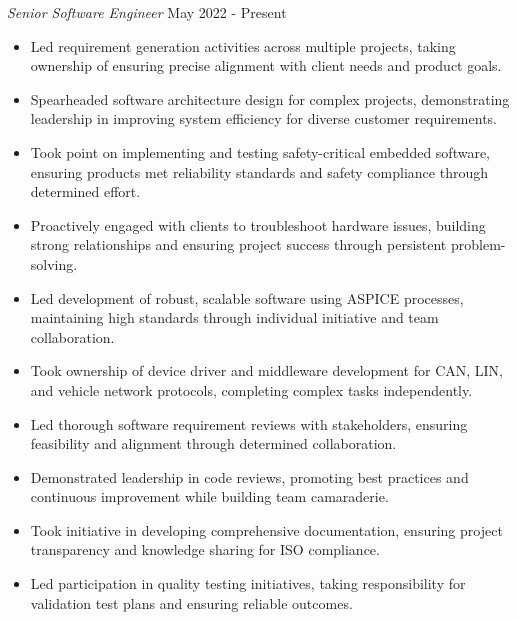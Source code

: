 \noindent
\textit{Senior Software Engineer} \hfill May 2022 - Present \\
\begin{itemize}[leftmargin=*,noitemsep,topsep=3pt]
    \item Led requirement generation activities across multiple projects, taking ownership of ensuring precise alignment with client needs and product goals.
    \item Spearheaded software architecture design for complex projects, demonstrating leadership in improving system efficiency for diverse customer requirements.
    \item Took point on implementing and testing safety-critical embedded software, ensuring products met reliability standards and safety compliance through determined effort.
    \item Proactively engaged with clients to troubleshoot hardware issues, building strong relationships and ensuring project success through persistent problem-solving.
    \item Led development of robust, scalable software using ASPICE processes, maintaining high standards through individual initiative and team collaboration.
    \item Took ownership of device driver and middleware development for CAN, LIN, and vehicle network protocols, completing complex tasks independently.
    \item Led thorough software requirement reviews with stakeholders, ensuring feasibility and alignment through determined collaboration.
    \item Demonstrated leadership in code reviews, promoting best practices and continuous improvement while building team camaraderie.
    \item Took initiative in developing comprehensive documentation, ensuring project transparency and knowledge sharing for ISO compliance.
    \item Led participation in quality testing initiatives, taking responsibility for validation test plans and ensuring reliable outcomes.
\end{itemize}